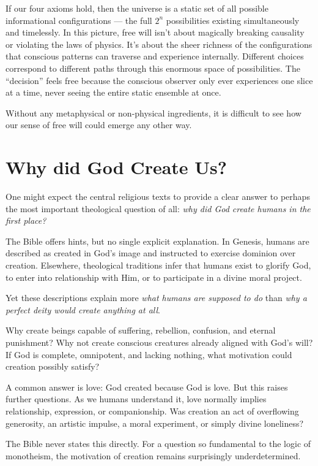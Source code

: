 If our four axioms hold, then the universe is a static set of all possible informational configurations — the full $2^n$
possibilities existing simultaneously and timelessly.
In this picture, free will isn’t about magically breaking causality or violating the laws of physics.
It’s about the sheer richness of the configurations that conscious patterns can traverse and experience internally.
Different choices correspond to different paths through this enormous space of possibilities.
The “decision” feels free because the conscious observer only ever experiences one slice at a time, never seeing the entire static ensemble at once.

Without any metaphysical or non-physical ingredients, it is difficult to see how our sense of free will could emerge any other way.


\section{Why did God Create Us?}

One might expect the central religious texts to provide a clear answer to perhaps the most important theological question of all: \emph{why did God create humans in the first place?}

The Bible offers hints, but no single explicit explanation.
In Genesis, humans are described as created in God's image and instructed to exercise dominion over creation.
Elsewhere, theological traditions infer that humans exist to glorify God, to enter into relationship with Him, or to participate in a divine moral project.

Yet these descriptions explain more \emph{what humans are supposed to do} than \emph{why a perfect deity would create anything at all}.

Why create beings capable of suffering, rebellion, confusion, and eternal punishment?
Why not create conscious creatures already aligned with God's will?
If God is complete, omnipotent, and lacking nothing, what motivation could creation possibly satisfy?

A common answer is love: God created because God is love.
But this raises further questions.
As we humans understand it, love normally implies relationship, expression, or companionship.
Was creation an act of overflowing generosity, an artistic impulse, a moral experiment, or simply divine loneliness?

The Bible never states this directly.
For a question so fundamental to the logic of monotheism, the motivation of creation remains surprisingly underdetermined.


